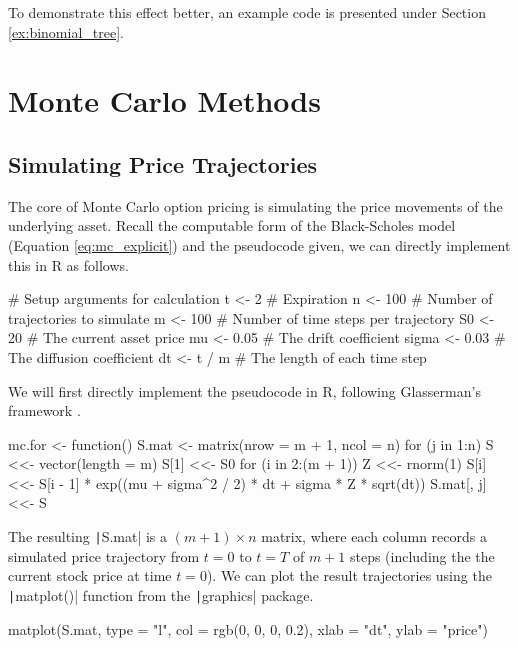 To demonstrate this effect better, an example code is presented under Section \ref{ex:binomial_tree}.

\section{Monte Carlo Methods}

\subsection{Simulating Price Trajectories}

The core of Monte Carlo option pricing is simulating the price movements of the underlying asset. Recall the computable form of the Black-Scholes model (Equation \ref{eq:mc_explicit}) and the pseudocode given, we can directly implement this in R as follows.

\begin{Rminted}
# Setup arguments for calculation
t <- 2 # Expiration
n <- 100 # Number of trajectories to simulate
m <- 100 # Number of time steps per trajectory
S0 <- 20 # The current asset price
mu <- 0.05 # The drift coefficient
sigma <- 0.03 # The diffusion coefficient
dt <- t / m # The length of each time step
\end{Rminted}

We will first directly implement the pseudocode in R, following Glasserman's framework \cite{Glasserman2003}.

\begin{Rminted}
mc.for <- function() {
    S.mat <- matrix(nrow = m + 1, ncol = n)
    for (j in 1:n) {
        S <<- vector(length = m)
        S[1] <<- S0
        for (i in 2:(m + 1)) {
            Z <<- rnorm(1)
            S[i] <<- S[i - 1] * exp((mu + sigma^2 / 2) * dt + sigma * Z * sqrt(dt))
        }
        S.mat[, j] <<- S
    }
}
\end{Rminted}

The resulting \texttt|S.mat| is a $(m + 1) \times n$ matrix, where each column records a simulated price trajectory from $t=0$ to $t=T$ of $m+1$ steps (including the the current stock price at time $t=0$). We can plot the result trajectories using the \texttt|matplot()| function from the \texttt|graphics| package.

\begin{Rminted}
matplot(S.mat, type = "l", col = rgb(0, 0, 0, 0.2),
        xlab = "dt", ylab = "price")
\end{Rminted}

